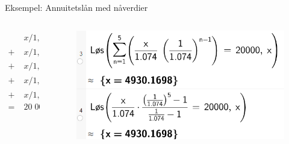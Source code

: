 \greenheader
\begin{frame}[t]{Eksempel: Annuitetslån med nåverdier}
\begin{center}
\end{center}
\begin{columns}[T,onlytextwidth]
\begin{column}{0.20\textwidth}
 \begin{align*}
      &x/ 1,074^1\\
      +\;&x/1,074^2\\
      +\;&x/ 1,074^3\\
      +\;&x/ 1,074^4\\
     +\;&x/ 1,074^5\\
      =\;&20\;000
    \end{align*}
  \end{column}
\begin{column}{0.80\textwidth}
\begin{figure}
    \centering
    \includegraphics[width=0.7\linewidth]{R2K1E-2.png}
\end{figure}
\end{column}
\end{columns}
\end{frame}


